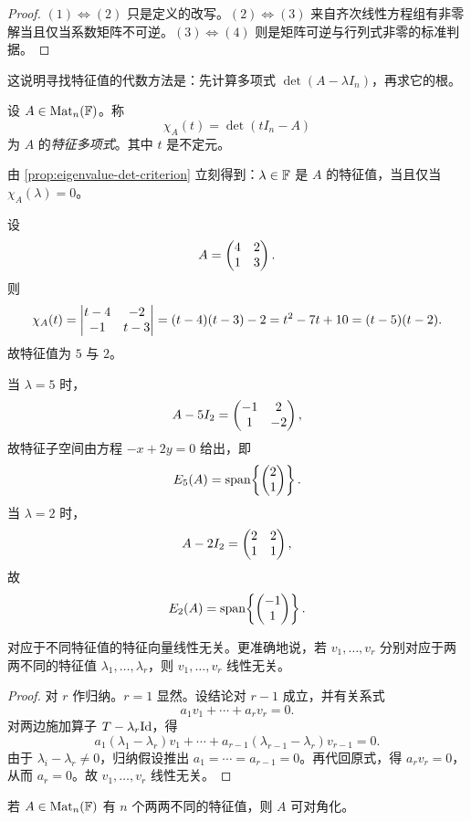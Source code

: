 \begin{proof}
\((1)\Leftrightarrow(2)\) 只是定义的改写。\((2)\Leftrightarrow(3)\) 来自齐次线性方程组有非零解当且仅当系数矩阵不可逆。\((3)\Leftrightarrow(4)\) 则是矩阵可逆与行列式非零的标准判据。
\end{proof}

这说明寻找特征值的代数方法是：先计算多项式 \(\det(A-\lambda I_n)\)，再求它的根。

\begin{definition}
设 \(A\in \mathrm{Mat}_n(\mathbb{F})\)。称
\[
\chi_A(t)=\det(tI_n-A)
\]
为 \(A\) 的\emph{特征多项式}。其中 \(t\) 是不定元。
\end{definition}

由 \cref{prop:eigenvalue-det-criterion} 立刻得到：\(\lambda\in \mathbb{F}\) 是 \(A\) 的特征值，当且仅当 \(\chi_A(\lambda)=0\)。

\begin{example}
设
\[
A=\begin{pmatrix} 4&2\\1&3 \end{pmatrix}.
\]
则
\[
\chi_A(t)=\begin{vmatrix} t-4&-2\\-1&t-3 \end{vmatrix}=(t-4)(t-3)-2=t^2-7t+10=(t-5)(t-2).
\]
故特征值为 \(5\) 与 \(2\)。

当 \(\lambda=5\) 时，
\[
A-5I_2=\begin{pmatrix} -1&2\\1&-2 \end{pmatrix},
\]
故特征子空间由方程 \(-x+2y=0\) 给出，即
\[
E_5(A)=\operatorname{span}\!\left\{\begin{pmatrix} 2\\1 \end{pmatrix}\right\}.
\]
当 \(\lambda=2\) 时，
\[
A-2I_2=\begin{pmatrix} 2&2\\1&1 \end{pmatrix},
\]
故
\[
E_2(A)=\operatorname{span}\!\left\{\begin{pmatrix} -1\\1 \end{pmatrix}\right\}.
\]
\end{example}

\begin{lemma}\label{lem:distinct-eigenvectors-li}
对应于不同特征值的特征向量线性无关。更准确地说，若 \(v_1,\dots,v_r\) 分别对应于两两不同的特征值 \(\lambda_1,\dots,\lambda_r\)，则 \(v_1,\dots,v_r\) 线性无关。
\end{lemma}

\begin{proof}
对 \(r\) 作归纳。\(r=1\) 显然。设结论对 \(r-1\) 成立，并有关系式
\[
a_1v_1+\cdots+a_rv_r=0.
\]
对两边施加算子 \(T-\lambda_r\mathrm{Id}\)，得
\[
a_1(\lambda_1-\lambda_r)v_1+\cdots+a_{r-1}(\lambda_{r-1}-\lambda_r)v_{r-1}=0.
\]
由于 \(\lambda_i-\lambda_r\neq 0\)，归纳假设推出 \(a_1=\cdots=a_{r-1}=0\)。再代回原式，得 \(a_rv_r=0\)，从而 \(a_r=0\)。故 \(v_1,\dots,v_r\) 线性无关。
\end{proof}

\begin{corollary}
若 \(A\in \mathrm{Mat}_n(\mathbb{F})\) 有 \(n\) 个两两不同的特征值，则 \(A\) 可对角化。
\end{corollary}

